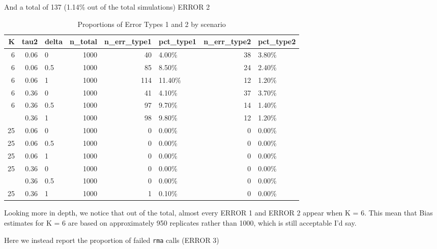 \documentclass{article}\usepackage[]{graphicx}\usepackage[]{xcolor}
\begin{document}
And a total of 137 (1.14\% out of the total simulations) ERROR 2
\begin{table}

\caption{\label{tab:tables.fail.combined}Proportions of Error Types 1 and 2 by scenario}
\centering
\begin{tabular}[t]{rrlrrlrl}
\toprule
K & tau2 & delta & n\_total & n\_err\_type1 & pct\_type1 & n\_err\_type2 & pct\_type2\\
\midrule
6 & 0.06 & 0 & 1000 & 40 & 4.00\% & 38 & 3.80\%\\
6 & 0.06 & 0.5 & 1000 & 85 & 8.50\% & 24 & 2.40\%\\
6 & 0.06 & 1 & 1000 & 114 & 11.40\% & 12 & 1.20\%\\
6 & 0.36 & 0 & 1000 & 41 & 4.10\% & 37 & 3.70\%\\
6 & 0.36 & 0.5 & 1000 & 97 & 9.70\% & 14 & 1.40\%\\
\addlinespace
6 & 0.36 & 1 & 1000 & 98 & 9.80\% & 12 & 1.20\%\\
25 & 0.06 & 0 & 1000 & 0 & 0.00\% & 0 & 0.00\%\\
25 & 0.06 & 0.5 & 1000 & 0 & 0.00\% & 0 & 0.00\%\\
25 & 0.06 & 1 & 1000 & 0 & 0.00\% & 0 & 0.00\%\\
25 & 0.36 & 0 & 1000 & 0 & 0.00\% & 0 & 0.00\%\\
\addlinespace
25 & 0.36 & 0.5 & 1000 & 0 & 0.00\% & 0 & 0.00\%\\
25 & 0.36 & 1 & 1000 & 1 & 0.10\% & 0 & 0.00\%\\
\bottomrule
\end{tabular}
\end{table}


 
 \FloatBarrier
Looking more in depth, we notice that out of the total, almost every ERROR 1 and ERROR 2 appear when K = 6.
This mean that Bias estimates for K = 6 are based on approximately 950 replicates rather than 1000, which is still acceptable I'd say. 

Here we instead report the proportion of failed \texttt{rma} calls (ERROR 3)
\end{document}
